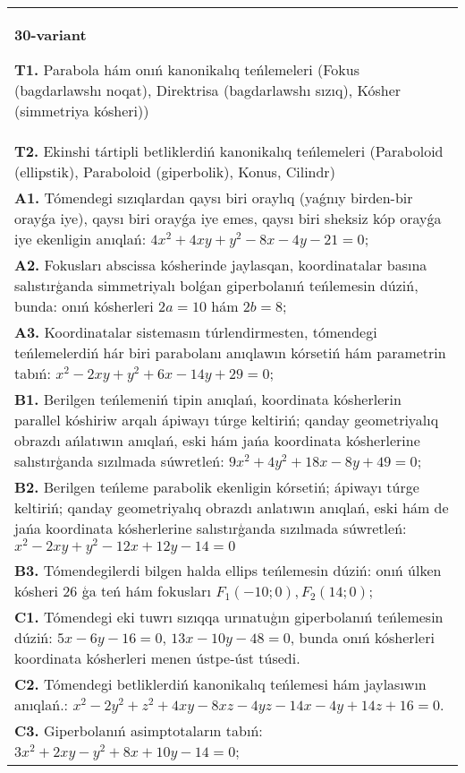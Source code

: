\documentclass{article}
\begin{document}
\begin{tabular}{m{17cm}}
\textbf{30-variant}
\newline

\textbf{T1.} Parabola hám onıń kanonikalıq teńlemeleri (Fokus (bagdarlawshı noqat), Direktrisa (bagdarlawshı sızıq), Kósher (simmetriya kósheri)) \\
\textbf{T2.} Ekinshi tártipli betliklerdiń kanonikalıq teńlemeleri (Paraboloid (ellipstik), Paraboloid (giperbolik), Konus, Cilindr) \\
\textbf{A1.} Tómendegi sızıqlardan qaysı biri oraylıq (yaǵnıy birden-bir orayǵa iye), qaysı biri orayǵa iye emes, qaysı biri sheksiz kóp orayǵa iye ekenligin anıqlań:  $4 x^2+4 x y+y^2-8 x-4 y-21=0$; \\
\textbf{A2.} Fokusları abscissa kósherinde jaylasqan, koordinatalar basına salıstırģanda simmetriyalı bolǵan giperbolanıń teńlemesin dúziń, bunda: onıń kósherleri $2 a=10$ hám $2 b=8$; \\
\textbf{A3.} Koordinatalar sistemasın túrlendirmesten, tómendegi teńlemelerdiń hár biri parabolanı anıqlawın kórsetiń hám parametrin tabıń: $x^2-2 x y+y^2+6 x-14 y+29=0$; \\
\textbf{B1.} Berilgen teńlemeniń tipin anıqlań, koordinata kósherlerin parallel kóshiriw arqalı ápiwayı túrge keltiriń; qanday geometriyalıq obrazdı ańlatıwın anıqlań, eski hám jańa koordinata kósherlerine salıstırģanda sızılmada súwretleń:  $9 x^2+4 y^2+18 x-8 y+49=0$; \\
\textbf{B2.} Berilgen teńleme parabolik ekenligin kórsetiń; ápiwayı túrge keltiriń; qanday geometriyalıq obrazdı anlatıwın anıqlań, eski hám de jańa koordinata kósherlerine salıstırģanda sızılmada súwretleń: $x^2-2 x y+y^2-12 x+12 y-14=0$ \\
\textbf{B3.} Tómendegilerdi bilgen halda ellips teńlemesin dúziń: onıń úlken kósheri 26 ģa teń hám fokusları $F_1 (-10; 0), F_2 (14; 0) $; \\
\textbf{C1.} Tómendegi eki tuwrı sızıqqa urınatuģın giperbolanıń teńlemesin dúziń: $5x-6y-16=0$, $13x-10y-48=0$, bunda onıń kósherleri koordinata kósherleri menen ústpe-úst túsedi. \\
\textbf{C2.} Tómendegi betliklerdiń kanonikalıq teńlemesi hám jaylasıwın anıqlań.: $x^2-2 y^2+z^2+4 x y-8 x z-4 y z-14 x-4 y+14 z+16=0$. \\
\textbf{C3.} Giperbolanıń asimptotaların tabıń: $3 x^2+2 x y-y^2+8 x+10 y-14=0$; \\

\end{tabular}
\vspace{1cm}
\end{document}

